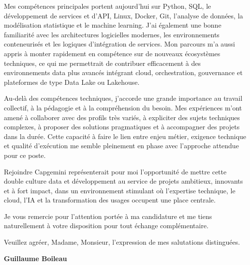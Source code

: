 \documentclass[11pt,a4paper]{../_shared/altacv}
\begin{document}
{Mes compétences principales portent aujourd’hui sur Python, SQL, le développement de services et d’API, Linux, Docker, Git, l’analyse de données, la modélisation statistique et le machine learning. J’ai également une bonne familiarité avec les architectures logicielles modernes, les environnements conteneurisés et les logiques d’intégration de services. Mon parcours m’a aussi appris à monter rapidement en compétence sur de nouveaux écosystèmes techniques, ce qui me permettrait de contribuer efficacement à des environnements data plus avancés intégrant cloud, orchestration, gouvernance et plateformes de type Data Lake ou Lakehouse.

Au-delà des compétences techniques, j’accorde une grande importance au travail collectif, à la pédagogie et à la compréhension du besoin. Mes expériences m’ont amené à collaborer avec des profils très variés, à expliciter des sujets techniques complexes, à proposer des solutions pragmatiques et à accompagner des projets dans la durée. Cette capacité à faire le lien entre enjeu métier, exigence technique et qualité d’exécution me semble pleinement en phase avec l’approche attendue pour ce poste.

Rejoindre Capgemini représenterait pour moi l’opportunité de mettre cette double culture data et développement au service de projets ambitieux, innovants et à fort impact, dans un environnement stimulant où l’expertise technique, le cloud, l’IA et la transformation des usages occupent une place centrale.

Je vous remercie pour l’attention portée à ma candidature et me tiens naturellement à votre disposition pour tout échange complémentaire.

Veuillez agréer, Madame, Monsieur, l’expression de mes salutations distinguées.

\textbf{Guillaume Boileau}

}
\end{document}
